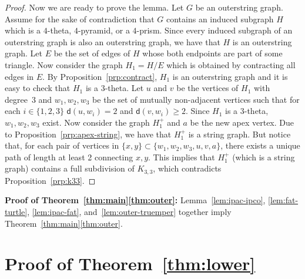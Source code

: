 \documentclass[a4paper]{article}
\newcommand{\dist}[2]{\mathsf{d}\left(#1,#2\right)}
\begin{document}
\begin{proof}
 Now we are ready to prove the lemma. Let $G$ be an outerstring graph. Assume for the sake of contradiction that $G$ contains an induced subgraph $H$ which is a $4$-theta, $4$-pyramid, or a $4$-prism. Since every induced subgraph of an outerstring graph is also an outerstring graph, we have that $H$ is an outerstring graph. Let $E$ be the set of edges of $H$ whose both endpoints are part of some triangle. Now consider the graph $H_1= H / E$ which is obtained by contracting all edges in $E$. By Proposition~\ref{prp:contract}, $H_1$ is an outerstring graph and it is easy to check that $H_1$ is a $3$-theta.
 Let $u$ and $v$ be the vertices of $H_1$ with degree~3 and $w_1,w_2,w_3$ be the set of mutually non-adjacent vertices such that for each $i\in \{1,2,3\}$ $\dist{u}{w_i}=2$ and $\dist{v}{w_i}\geq 2$. Since $H_1$ is a $3$-theta, $w_1,w_2,w_3$ exist. Now consider the graph $H_1^+$ and $a$ be the new apex vertex. Due to Proposition~\ref{prp:apex-string}, we have that $H_1^+$ is a string graph. But notice that, for each pair of vertices in $\{x,y\} \subset \{w_1,w_2,w_3,u,v,a\}$, there exists a unique path of length {at least 2} connecting $x,y$. This implies that $H_1^+$ (which is a string graph) contains a full subdivision of $K_{3,3}$, which contradicts Proposition~\ref{prp:k33}. 
  \end{proof}


\noindent \textbf{Proof of Theorem~\ref{thm:main}\ref{thm:outer}:} Lemma~\ref{lem:ipac-ipco}, \ref{lem:fat-turtle}, \ref{lem:ipac-fat}, and~\ref{lem:outer-truemper} together imply Theorem~\ref{thm:main}\ref{thm:outer}.

 

\section{Proof of Theorem~\ref{thm:lower}}\label{sec:lower}

\newcommand{\Graph}[1]{X_{#1}}
\newcommand{\BGraph}[1]{Y_{#1}}
\newcommand{\CGraph}[1]{Z_{#1}}
\newcommand{\DGraph}[1]{W_{#1}}
\end{document}
